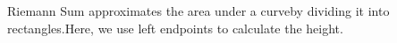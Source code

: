 \documentclass[preview]{standalone}
\begin{document}
\begin{center}
Riemann Sum approximates the area under a curveby dividing it into rectangles.Here, we use left endpoints to calculate the height.
\end{center}
\end{document}
